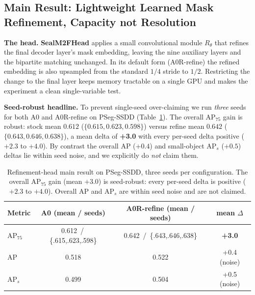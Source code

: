 \subsection{Main Result: Lightweight Learned Mask Refinement, Capacity not Resolution}
\label{ssec:main}
\textbf{The head.} \textbf{SealM2FHead} applies a small convolutional module $R_\theta$ that refines the final decoder layer's mask embedding, leaving the nine auxiliary layers and the bipartite matching unchanged. In its default form (A0R-refine) the refined embedding is also upsampled from the standard $1/4$ stride to $1/2$. Restricting the change to the final layer keeps memory tractable on a single GPU and makes the experiment a clean single-variable test.

\textbf{Seed-robust headline.} To prevent single-seed over-claiming we run \emph{three} seeds for both A0 and A0R-refine on PSeg-SSDD (Table~\ref{tab:main-pseg}). The overall AP$_{75}$ gain is robust: stock mean $0.612$ ($\{0.615,0.623,0.598\}$) versus refine mean $0.642$ ($\{0.643,0.646,0.638\}$), a mean delta of \textbf{+3.0} with every per-seed delta positive ($+2.3$ to $+4.0$). By contrast the overall AP ($+0.4$) and small-object AP$_{s}$ ($+0.5$) deltas lie within seed noise, and we explicitly do \emph{not} claim them.

\begin{table}[t]
\centering
\caption{Refinement-head main result on PSeg-SSDD, three seeds per configuration. The overall AP$_{75}$ gain (mean $+3.0$) is seed-robust: every per-seed delta is positive ($+2.3$ to $+4.0$). Overall AP and AP$_{s}$ are within seed noise and are not claimed.}
\label{tab:main-pseg}
\begin{tabular}{@{}lccc@{}}
\toprule
Metric & A0 (mean / seeds) & A0R-refine (mean / seeds) & mean $\Delta$ \\
\midrule
AP$_{75}$ & 0.612 \,/\, \{.615,.623,.598\} & 0.642 \,/\, \{.643,.646,.638\} & \textbf{+3.0} \\
AP        & 0.518 & 0.522 & +0.4 \;(noise) \\
AP$_{s}$  & 0.499 & 0.504 & +0.5 \;(noise) \\
\bottomrule
\end{tabular}
\end{table}

